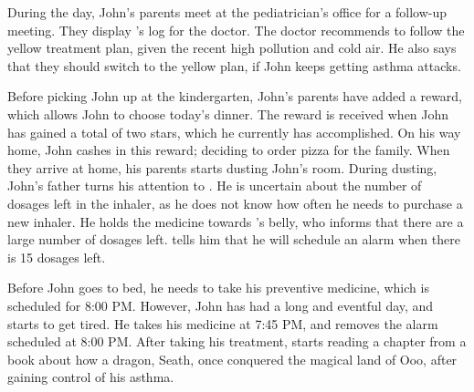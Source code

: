 During the day, John's parents meet at the pediatrician's office for a follow-up meeting. They display \app{}'s log for the doctor. The doctor recommends to follow the yellow treatment plan, given the recent high pollution and cold air. He also says that they should switch to the yellow plan, if John keeps getting asthma attacks.

Before picking John up at the kindergarten, John's parents have added a reward, which allows John to choose today's dinner. The reward is received when John has gained a total of two stars, which he currently has accomplished. On his way home, John cashes in this reward; deciding to order pizza for the family. When they arrive at home, his parents starts dusting John's room. During dusting, John's father turns his attention to \buddy{}. He is uncertain about the number of dosages left in the inhaler, as he does not know how often he needs to purchase a new inhaler. He holds the medicine towards \buddy{}'s belly, who informs that there are a large number of dosages left. \buddy{} tells him that he will schedule an alarm when there is 15 dosages left. 

Before John goes to bed, he needs to take his preventive medicine, which is scheduled for 8:00 PM. However, John has had a long and eventful day, and starts to get tired. He takes his medicine at 7:45 PM, and \buddy{} removes the alarm scheduled at 8:00 PM. After taking his treatment, \buddy{} starts reading a chapter from a book about how a dragon, Seath, once conquered the magical land of Ooo, after gaining control of his asthma. 